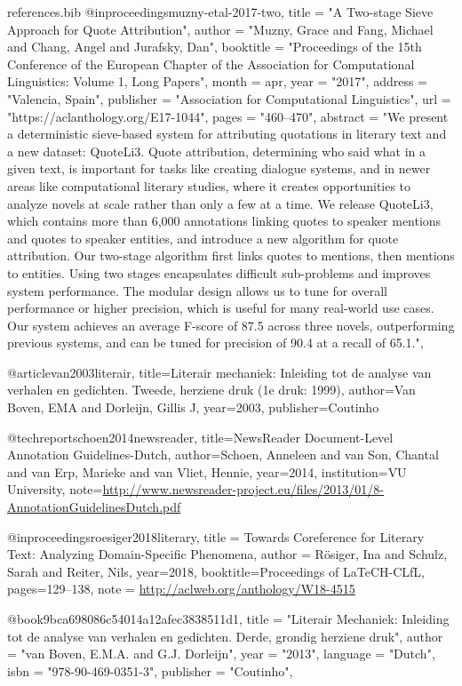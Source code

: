 \RequirePackage{filecontents}
\begin{filecontents}{references.bib}
@inproceedings{muzny-etal-2017-two,
    title = "A Two-stage Sieve Approach for Quote Attribution",
    author = "Muzny, Grace  and
      Fang, Michael  and
      Chang, Angel  and
      Jurafsky, Dan",
    booktitle = "Proceedings of the 15th Conference of the {E}uropean Chapter of the Association for Computational Linguistics: Volume 1, Long Papers",
    month = apr,
    year = "2017",
    address = "Valencia, Spain",
    publisher = "Association for Computational Linguistics",
    url = "https://aclanthology.org/E17-1044",
    pages = "460--470",
    abstract = "We present a deterministic sieve-based system for attributing quotations in literary text and a new dataset: QuoteLi3. Quote attribution, determining who said what in a given text, is important for tasks like creating dialogue systems, and in newer areas like computational literary studies, where it creates opportunities to analyze novels at scale rather than only a few at a time. We release QuoteLi3, which contains more than 6,000 annotations linking quotes to speaker mentions and quotes to speaker entities, and introduce a new algorithm for quote attribution. Our two-stage algorithm first links quotes to mentions, then mentions to entities. Using two stages encapsulates difficult sub-problems and improves system performance. The modular design allows us to tune for overall performance or higher precision, which is useful for many real-world use cases. Our system achieves an average F-score of 87.5 across three novels, outperforming previous systems, and can be tuned for precision of 90.4 at a recall of 65.1.",
}

@article{van2003literair,
  title={Literair mechaniek: Inleiding tot de analyse van verhalen en gedichten. Tweede, herziene druk (1e druk: 1999)},
  author={Van Boven, EMA and Dorleijn, Gillis J},
  year={2003},
  publisher={Coutinho}
}

@techreport{schoen2014newsreader,
  title={NewsReader Document-Level Annotation Guidelines-Dutch},
  author={Schoen, Anneleen and van Son, Chantal and van Erp, Marieke and van Vliet, Hennie},
  year={2014},
  institution={VU University},
  note={\url{http://www.newsreader-project.eu/files/2013/01/8-AnnotationGuidelinesDutch.pdf}}
}

@inproceedings{roesiger2018literary,
    title = {Towards Coreference for Literary Text: Analyzing Domain-Specific Phenomena},
    author = {R\"osiger, Ina  and Schulz, Sarah  and Reiter, Nils},
    year={2018},
    booktitle={Proceedings of LaTeCH-CLfL},
    pages={129--138},
    note = {\url{http://aclweb.org/anthology/W18-4515}}
}


@book{9bca698086c54014a12afec3838511d1,
title = "Literair Mechaniek: Inleiding tot de analyse van verhalen en gedichten. Derde, grondig herziene druk",
author = "{van Boven}, E.M.A. and G.J. Dorleijn",
year = "2013",
language = "Dutch",
isbn = "978-90-469-0351-3",
publisher = "Coutinho",
}


\end{filecontents}
